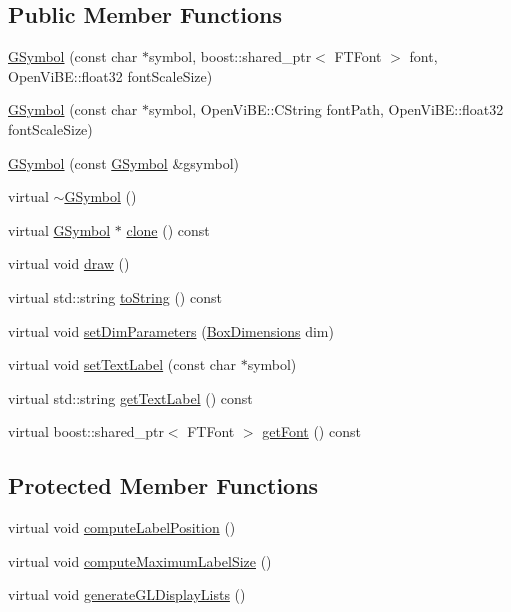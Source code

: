 \subsection*{Public Member Functions}
\begin{DoxyCompactItemize}
\item 
\hyperlink{classOpenViBEApplications_1_1GSymbol_a597ee43c991d767196400779091826c3}{GSymbol} (const char $\ast$symbol, boost::shared\_\-ptr$<$ FTFont $>$ font, OpenViBE::float32 fontScaleSize)
\item 
\hyperlink{classOpenViBEApplications_1_1GSymbol_a9939ec117a7f3dbfe63507d8b1f08696}{GSymbol} (const char $\ast$symbol, OpenViBE::CString fontPath, OpenViBE::float32 fontScaleSize)
\item 
\hyperlink{classOpenViBEApplications_1_1GSymbol_ac99e2473e7dda70294af2edb4bcde686}{GSymbol} (const \hyperlink{classOpenViBEApplications_1_1GSymbol}{GSymbol} \&gsymbol)
\item 
virtual \hyperlink{classOpenViBEApplications_1_1GSymbol_abf9d04bc833730fc6efe2e22fa8a36e0}{$\sim$GSymbol} ()
\item 
virtual \hyperlink{classOpenViBEApplications_1_1GSymbol}{GSymbol} $\ast$ \hyperlink{classOpenViBEApplications_1_1GSymbol_af8dff353fcf951388275cc05dea15665}{clone} () const 
\item 
virtual void \hyperlink{classOpenViBEApplications_1_1GSymbol_a45a39e83701c4692f97d7b82a6fd7567}{draw} ()
\item 
virtual std::string \hyperlink{classOpenViBEApplications_1_1GSymbol_afec3806bc335de92b23d072f64faa56e}{toString} () const 
\item 
virtual void \hyperlink{classOpenViBEApplications_1_1GSymbol_a7b03ff2c19eb8ef34decd0b5ce8f6211}{setDimParameters} (\hyperlink{structOpenViBEApplications_1_1__BoxDimensions}{BoxDimensions} dim)
\item 
virtual void \hyperlink{classOpenViBEApplications_1_1GSymbol_a710522b9eab1794764bbe28aca85b354}{setTextLabel} (const char $\ast$symbol)
\item 
virtual std::string \hyperlink{classOpenViBEApplications_1_1GSymbol_af3c7e24797c217233d450a3b03324ab5}{getTextLabel} () const 
\item 
virtual boost::shared\_\-ptr$<$ FTFont $>$ \hyperlink{classOpenViBEApplications_1_1GSymbol_ab1a0c5b925c3f64ff430561532187e8b}{getFont} () const 
\end{DoxyCompactItemize}
\subsection*{Protected Member Functions}
\begin{DoxyCompactItemize}
\item 
virtual void \hyperlink{classOpenViBEApplications_1_1GSymbol_a466e619246af5eac18a25df98ca52b26}{computeLabelPosition} ()
\item 
virtual void \hyperlink{classOpenViBEApplications_1_1GSymbol_a53747ffe50a464dd798328075d8760b0}{computeMaximumLabelSize} ()
\item 
virtual void \hyperlink{classOpenViBEApplications_1_1GSymbol_a0a07d49a58665cda4b0fc5da8109672c}{generateGLDisplayLists} ()
\end{DoxyCompactItemize}
